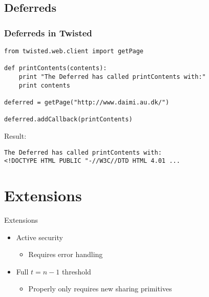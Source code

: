 \documentclass[t,noamsthm]{beamer}
\begin{document}
\subsection{Deferreds}

\begin{frame}[fragile]

\frametitle{Deferreds in Twisted}

\begin{lstlisting}
from twisted.web.client import getPage

def printContents(contents):
    print "The Deferred has called printContents with:"
    print contents

deferred = getPage("http://www.daimi.au.dk/")

deferred.addCallback(printContents)
\end{lstlisting}

Result:
\begin{lstlisting}[language={}]
The Deferred has called printContents with:
<!DOCTYPE HTML PUBLIC "-//W3C//DTD HTML 4.01 ...
\end{lstlisting}

\end{frame}


\section{Extensions}

\begin{frame}{Extensions}

  \begin{itemize}
  \item Active security
    \begin{itemize}
    \item Requires error handling
    \end{itemize}

  \item Full $t = n-1$ threshold
    \begin{itemize}
    \item Properly only requires new sharing primitives
    \end{itemize}
  \end{itemize}

\end{frame}
\end{document}
